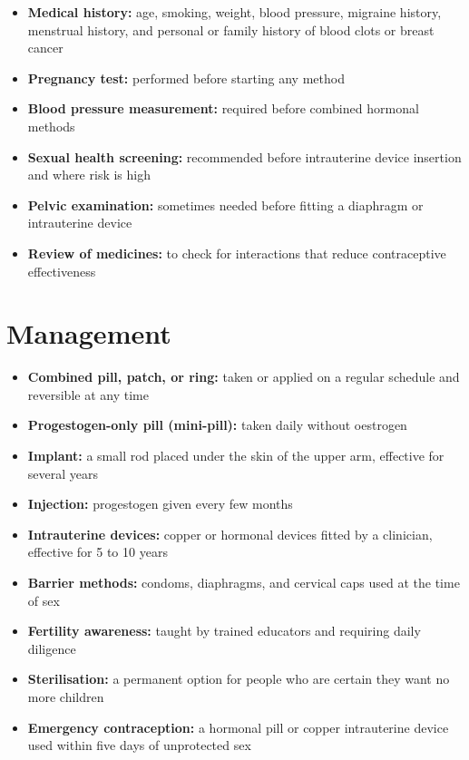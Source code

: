 \begin{itemize}
    \item \textbf{Medical history:} age, smoking, weight, blood pressure, migraine history, menstrual history, and personal or family history of blood clots or breast cancer
    \item \textbf{Pregnancy test:} performed before starting any method
    \item \textbf{Blood pressure measurement:} required before combined hormonal methods
    \item \textbf{Sexual health screening:} recommended before intrauterine device insertion and where risk is high
    \item \textbf{Pelvic examination:} sometimes needed before fitting a diaphragm or intrauterine device
    \item \textbf{Review of medicines:} to check for interactions that reduce contraceptive effectiveness
\end{itemize}

\section*{Management}
\begin{itemize}
    \item \textbf{Combined pill, patch, or ring:} taken or applied on a regular schedule and reversible at any time
    \item \textbf{Progestogen-only pill (mini-pill):} taken daily without oestrogen
    \item \textbf{Implant:} a small rod placed under the skin of the upper arm, effective for several years
    \item \textbf{Injection:} progestogen given every few months
    \item \textbf{Intrauterine devices:} copper or hormonal devices fitted by a clinician, effective for 5 to 10 years
    \item \textbf{Barrier methods:} condoms, diaphragms, and cervical caps used at the time of sex
    \item \textbf{Fertility awareness:} taught by trained educators and requiring daily diligence
    \item \textbf{Sterilisation:} a permanent option for people who are certain they want no more children
    \item \textbf{Emergency contraception:} a hormonal pill or copper intrauterine device used within five days of unprotected sex
\end{itemize}

